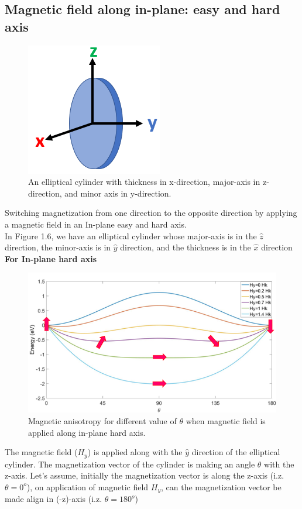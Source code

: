 \documentclass[12pt,a4paper,bold]{thesis}
\theoremstyle{thm}
\theoremstyle{definition}
\begin{document}
\subsection{Magnetic field along in-plane: easy and hard axis}
\begin{figure}[H]
	\centering
   \includegraphics[scale=0.56]{Images/19.png} 
   \caption{An elliptical cylinder with thickness in x-direction, major-axis in z-direction, and minor axis in y-direction.}
\end{figure} 
\indent \indent \indent Switching magnetization from one direction to the opposite direction by applying a magnetic field in an In-plane easy and hard axis.~\cite{RefWorks:167, nature_news_art}\\
In Figure 1.6, we have an elliptical cylinder whose major-axis is in the $\hat{z}$ direction, the minor-axis is in $\hat{y}$ direction, and the thickness is in the $\hat{x}$ direction\\

\textbf{For In-plane hard axis}\\
\begin{figure}[H]
	\centering
   \includegraphics[scale=0.56]{Images/20.png} 
   \caption{Magnetic anisotropy for different value of $\theta$ when magnetic field is applied along in-plane hard axis.}
\end{figure}
\indent \indent The magnetic field (\textbf{$H_y$}) is applied along with the $\hat{y}$ direction of the elliptical cylinder. The magnetization vector of the cylinder is making an angle $\theta$ with the z-axis. Let's assume, initially the magnetization vector is along the z-axis (i.z. $\theta=0^o$), on application of magnetic field $H_y$, can the magnetization vector be made align in (-z)-axis (i.z. $\theta=180^o$)
\end{document}
